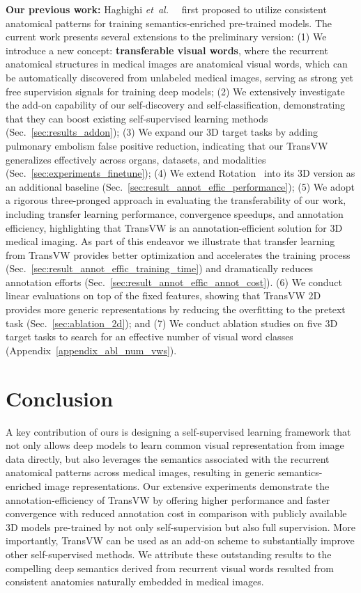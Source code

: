 \documentclass[journal,twoside,web]{ieeecolor}
\def\sectionname{Sec.}
\newcommand{\etal}{\mbox{\emph{et al.\ }}}
\begin{document}
\smallskip
\noindent\textbf{Our previous work:} Haghighi \etal~\cite{haghighi2020learning} first proposed to utilize consistent anatomical patterns for training semantics-enriched pre-trained models.  The current work presents several extensions to the preliminary
version: (1) We introduce a new concept: \textbf{transferable visual words}, where the recurrent anatomical structures in medical images are anatomical visual words, which can be automatically discovered from unlabeled medical images, serving as strong yet free supervision signals for training deep models; 
(2) We extensively investigate the  add-on  capability of our self-discovery and self-classification, demonstrating that they can boost existing self-supervised learning methods (\sectionname~\ref{sec:results_addon}); (3) We expand our 3D target tasks by adding  pulmonary embolism false positive reduction, indicating that our TransVW generalizes effectively across  organs,  datasets, and  modalities (\sectionname~\ref{sec:experiments_finetune}); (4) We extend  Rotation~\cite{gidaris2018unsupervised} into its 3D version as an additional baseline (\sectionname~\ref{sec:result_annot_effic_performance});
 (5) We  adopt  a  rigorous  three-pronged  approach in  evaluating the transferability of our  work, including  transfer learning performance, convergence speedups,  and annotation efficiency, highlighting that TransVW is an annotation-efficient solution for 3D medical imaging. As part of this endeavor we illustrate that transfer learning from TransVW provides better optimization and accelerates the training process (\sectionname~\ref{sec:result_annot_effic_training_time}) and dramatically reduces annotation efforts (\sectionname~\ref{sec:result_annot_effic_annot_cost}).
 (6) We conduct linear evaluations on top of the fixed features, showing that TransVW 2D provides more generic representations by reducing the overfitting to the pretext task (\sectionname~\ref{sec:ablation_2d}); and  (7) We conduct  ablation studies on five 3D target tasks to search for an effective number of visual word classes (Appendix~\ref{appendix_abl_num_vws}). 

\section{Conclusion}
A key contribution of ours is designing a self-supervised learning framework that not only allows deep models to learn common visual representation from image data directly, but also leverages the semantics associated with the recurrent anatomical patterns across  medical  images, resulting in generic semantics-enriched image representations. Our extensive experiments  demonstrate the annotation-efficiency of TransVW by offering  higher performance and faster  convergence with reduced annotation cost  in comparison with publicly available 3D models pre-trained by  not only self-supervision but also full supervision. More importantly, TransVW can be used as an add-on scheme to substantially improve other self-supervised methods. We attribute these outstanding results to the compelling deep semantics derived from recurrent visual words resulted from consistent anatomies naturally embedded in medical images.
\end{document}
